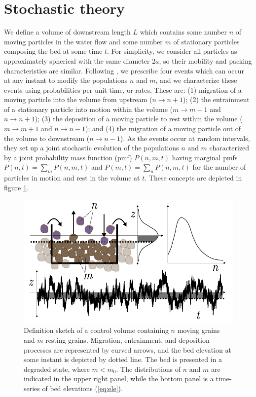 \documentclass[draft]{agujournal2018}
\begin{document}
\section{Stochastic theory}
\label{sec:theory}

We define a volume of downstream length $L$ which contains some number $n$ of moving particles in the water flow and some number $m$ of stationary particles composing the bed at some time $t$.
For simplicity, we consider all particles as approximately spherical with the same diameter $2a$, so their mobility and packing characteristics are similar.
Following \citet{Ancey2008}, we prescribe four events which can occur at any instant to modify the populations $n$ and $m$, and we characterize these events using probabilities per unit time, or rates.
These are: (1) migration of a moving particle into the volume from upstream ($n \rightarrow n+1$); (2) the entrainment of a stationary particle into motion within the volume ($m\rightarrow m-1$ and $n\rightarrow n+1$); (3) the deposition of a moving particle to rest within the volume ($m\rightarrow m+1$ and $n\rightarrow n-1$); and (4) the migration of a moving particle out of the volume to downstream ($n\rightarrow n-1$).
As the events occur at random intervals, they set up a joint stochastic evolution of the populations $n$ and $m$ characterized by a joint probability mass function (pmf) $P(n,m,t)$ having marginal pmfs $P(n,t) = \sum_m P(n,m,t)$ and $P(m,t) = \sum_n P(n,m,t)$ for the number of particles in motion and rest in the volume at $t$.
These concepts are depicted in figure \ref{fig:concept}.
\begin{figure}
  \includegraphics[width=\linewidth,keepaspectratio]{./figures/definition-combo.pdf}
  \vspace{-1.0cm}
  \caption{Definition sketch of a control volume containing $n$ moving grains and $m$ resting grains. Migration, entrainment, and deposition processes are represented by curved arrows, and the bed elevation at some instant is depicted by dotted line. The bed is presented in a degraded state, where $m<m_0$. The distributions of $n$ and $m$ are indicated in the upper right panel, while the bottom panel is a time-series of bed elevations (\ref{eq:ele}).}
  \label{fig:concept}
\vspace{-0.75cm}
\end{figure}
\end{document}
